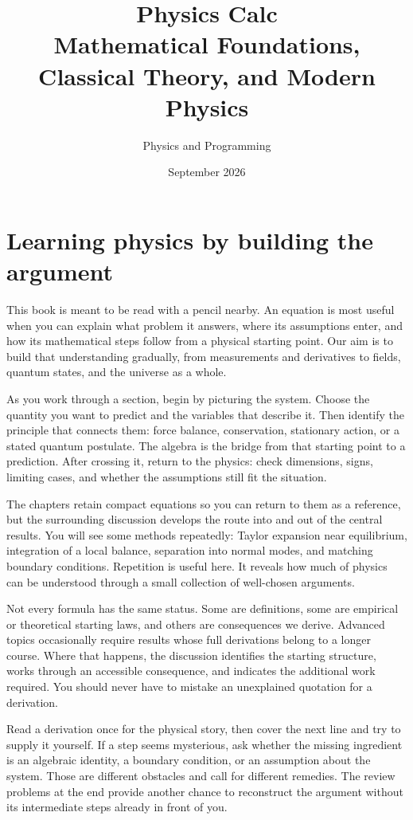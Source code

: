 \documentclass[11pt,oneside]{book}
\title{Physics Calc\\\large Mathematical Foundations, Classical Theory, and Modern Physics}
\author{Physics and Programming}
\date{September 2026}
\theoremstyle{reviewstyle}
\begin{document}
\frontmatter
\hypersetup{pageanchor=false}
\maketitle
\hypersetup{pageanchor=true}
\tableofcontents

\chapter*{Learning physics by building the argument}
This book is meant to be read with a pencil nearby. An equation is most useful when you can explain what problem it answers, where its assumptions enter, and how its mathematical steps follow from a physical starting point. Our aim is to build that understanding gradually, from measurements and derivatives to fields, quantum states, and the universe as a whole.

As you work through a section, begin by picturing the system. Choose the quantity you want to predict and the variables that describe it. Then identify the principle that connects them: force balance, conservation, stationary action, or a stated quantum postulate. The algebra is the bridge from that starting point to a prediction. After crossing it, return to the physics: check dimensions, signs, limiting cases, and whether the assumptions still fit the situation.

The chapters retain compact equations so you can return to them as a reference, but the surrounding discussion develops the route into and out of the central results. You will see some methods repeatedly: Taylor expansion near equilibrium, integration of a local balance, separation into normal modes, and matching boundary conditions. Repetition is useful here. It reveals how much of physics can be understood through a small collection of well-chosen arguments.

Not every formula has the same status. Some are definitions, some are empirical or theoretical starting laws, and others are consequences we derive. Advanced topics occasionally require results whose full derivations belong to a longer course. Where that happens, the discussion identifies the starting structure, works through an accessible consequence, and indicates the additional work required. You should never have to mistake an unexplained quotation for a derivation.

Read a derivation once for the physical story, then cover the next line and try to supply it yourself. If a step seems mysterious, ask whether the missing ingredient is an algebraic identity, a boundary condition, or an assumption about the system. Those are different obstacles and call for different remedies. The review problems at the end provide another chance to reconstruct the argument without its intermediate steps already in front of you.
\end{document}
